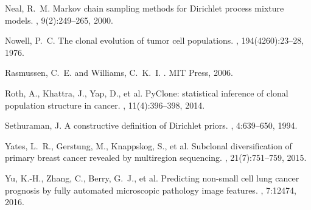 \documentclass{article}
\begin{document}
\begin{thebibliography}{}
Neal, R.~M.
\newblock Markov chain sampling methods for Dirichlet process mixture models.
, 9(2):249--265,
2000.

Nowell, P.~C.
\newblock The clonal evolution of tumor cell populations.
, 194(4260):23--28, 1976.

Rasmussen, C.~E. and Williams, C.~K.~I.
.
\newblock MIT Press, 2006.

Roth, A., Khattra, J., Yap, D., et al.
\newblock PyClone: statistical inference of clonal population structure in cancer.
, 11(4):396--398, 2014.

Sethuraman, J.
\newblock A constructive definition of Dirichlet priors.
, 4:639--650, 1994.

Yates, L.~R., Gerstung, M., Knappskog, S., et al.
\newblock Subclonal diversification of primary breast cancer revealed by multiregion
sequencing.
, 21(7):751--759, 2015.

Yu, K.-H., Zhang, C., Berry, G.~J., et al.
\newblock Predicting non-small cell lung cancer prognosis by fully automated
microscopic pathology image features.
, 7:12474, 2016.

\end{thebibliography}
\end{document}
